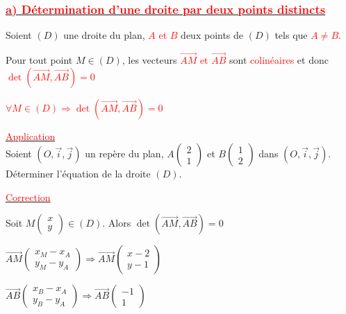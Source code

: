\documentclass[12pt,a4paper]{article}
\begin{document}
\subsubsection*{\underline{\textcolor{red}{a) Détermination d'une droite par deux points distincts}}}

Soient $(D)$ une droite du plan, \textcolor{red}{$A$ et $B$} deux points de $(D)$ tels que \textcolor{red}{$A \neq B$}.

Pour tout point $M \in (D)$, les vecteurs \textcolor{red}{$\overrightarrow{AM}$ et $\overrightarrow{AB}$} sont \textcolor{red}{colinéaires} et donc \textcolor{red}{$\det(\overrightarrow{AM}, \overrightarrow{AB}) = 0$}

\begin{center}
    \textcolor{red}{$\forall M \in (D) \Rightarrow \det(\overrightarrow{AM}, \overrightarrow{AB}) = 0$}
\end{center}

\noindent \underline{\textcolor{red}{Application}} \\
Soient $(O, \vec{i}, \vec{j})$ un repère du plan, $A \begin{pmatrix} 2 \\ 1 \end{pmatrix}$ et $B \begin{pmatrix} 1 \\ 2 \end{pmatrix}$ dans $(O, \vec{i}, \vec{j})$. \\
Déterminer l'équation de la droite $(D)$.

\begin{center}
    \underline{\textcolor{red}{Correction}}
\end{center}

\noindent Soit $M \begin{pmatrix} x \\ y \end{pmatrix} \in (D)$. Alors $\det(\overrightarrow{AM}, \overrightarrow{AB}) = 0$

$\overrightarrow{AM} \begin{pmatrix} x_M - x_A \\ y_M - y_A \end{pmatrix} \Rightarrow \overrightarrow{AM} \begin{pmatrix} x - 2 \\ y - 1 \end{pmatrix}$

$\overrightarrow{AB} \begin{pmatrix} x_B - x_A \\ y_B - y_A \end{pmatrix} \Rightarrow \overrightarrow{AB} \begin{pmatrix} -1 \\ 1 \end{pmatrix}$
\end{document}
